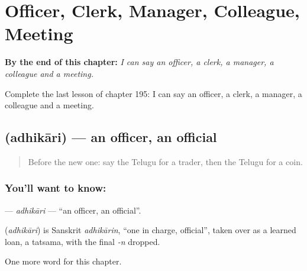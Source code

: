 
\chapter{Officer, Clerk, Manager, Colleague, Meeting}
\label{ch:te-officer-clerk-manager-colleague-meeting}

\begin{chapteropening}
\textbf{By the end of this chapter:} \emph{I can say an officer, a clerk, a manager, a colleague and a meeting.}

Complete the last lesson of chapter 195: I can say an officer, a clerk, a manager, a colleague and a meeting.
\end{chapteropening}

\section[\texorpdfstring{\te{అధికారి} (adhikāri)}{అధికారి (adhikāri)}]{ (adhikāri) — an officer, an official}

\label{lesson:TE-C195-adhikari}



\begin{quote}
Before the new one: say the Telugu for a trader, then the Telugu for a coin.
\end{quote}

\subsection*{You'll want to know: }
\textbf{} — \emph{adhikāri} — \textquotedblleft{}an officer, an official\textquotedblright{}.

\begin{cousinweb}
\textbf{} (\emph{adhikāri}) is Sanskrit \emph{adhikārin}, \textquotedblleft{}one in charge, official\textquotedblright{}, taken over as a learned loan, a tatsama, with the final \emph{-n} dropped.
\end{cousinweb}

\begin{grammarlens}[title={What you've built}]
One more word for this chapter.
\end{grammarlens}

